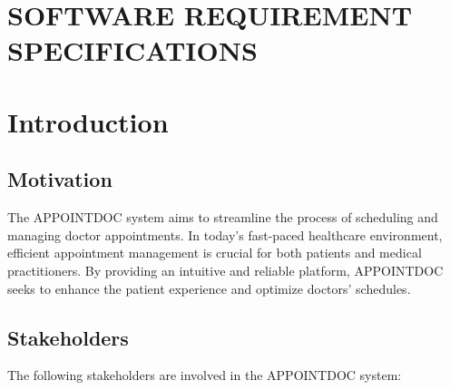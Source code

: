 \documentclass[a4paper, 12pt]{article}
\begin{document}
\tableofcontents
\newpage

\section*{\centering SOFTWARE REQUIREMENT SPECIFICATIONS}

\section{Introduction}

\subsection{Motivation}
The APPOINTDOC system aims to streamline the process of scheduling and managing doctor appointments. In today's fast-paced healthcare environment, efficient appointment management is crucial for both patients and medical practitioners. By providing an intuitive and reliable platform, APPOINTDOC seeks to enhance the patient experience and optimize doctors' schedules.

\subsection{Stakeholders}
The following stakeholders are involved in the APPOINTDOC system:
\end{document}
